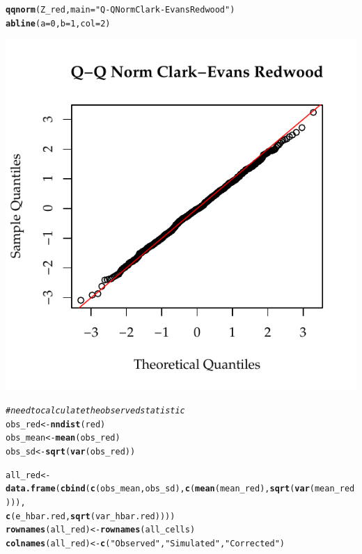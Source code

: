 \documentclass{article}\usepackage[]{graphicx}\usepackage[]{color}
\makeatletter
\def\maxwidth{ %
  \ifdim\Gin@nat@width>\linewidth
    \linewidth
  \else
    \Gin@nat@width
  \fi
}
\newcommand{\hlnum}[1]{\textcolor[rgb]{0.686,0.059,0.569}{#1}}%
\newcommand{\hlstr}[1]{\textcolor[rgb]{0.192,0.494,0.8}{#1}}%
\newcommand{\hlcom}[1]{\textcolor[rgb]{0.678,0.584,0.686}{\textit{#1}}}%
\newcommand{\hlstd}[1]{\textcolor[rgb]{0.345,0.345,0.345}{#1}}%
\newcommand{\hlkwb}[1]{\textcolor[rgb]{0.69,0.353,0.396}{#1}}%
\newcommand{\hlkwc}[1]{\textcolor[rgb]{0.333,0.667,0.333}{#1}}%
\newcommand{\hlkwd}[1]{\textcolor[rgb]{0.737,0.353,0.396}{\textbf{#1}}}%
\newenvironment{kframe}{%
 \def\at@end@of@kframe{}%
 \ifinner\ifhmode%
  \def\at@end@of@kframe{\end{minipage}}%
  \begin{minipage}{\columnwidth}%
 \fi\fi%
 \def\FrameCommand##1{\hskip\@totalleftmargin \hskip-\fboxsep
 \colorbox{shadecolor}{##1}\hskip-\fboxsep
     \hskip-\linewidth \hskip-\@totalleftmargin \hskip\columnwidth}%
 \MakeFramed {\advance\hsize-\width
   \@totalleftmargin\z@ \linewidth\hsize
   \@setminipage}}%
 {\par\unskip\endMakeFramed%
 \at@end@of@kframe}
\newenvironment{knitrout}{}{} %
\makeatother
\begin{document}
\begin{enumerate}
\begin{enumerate}
\begin{knitrout}
\begin{kframe}
\begin{alltt}
\hlkwd{qqnorm}\hlstd{(Z_red,} \hlkwc{main} \hlstd{=} \hlstr{"Q-Q Norm Clark-Evans Redwood"}\hlstd{)}
\hlkwd{abline}\hlstd{(}\hlkwc{a}\hlstd{=}\hlnum{0}\hlstd{,}\hlkwc{b}\hlstd{=}\hlnum{1}\hlstd{,}\hlkwc{col}\hlstd{=}\hlnum{2}\hlstd{)}
\end{alltt}
\end{kframe}

{\centering \includegraphics[width=\maxwidth]{figure/prob2g_redwood-1} 

}



\end{knitrout}

\begin{kframe}
\begin{alltt}
\hlcom{# need to calculate the observed statistic}
\hlstd{obs_red} \hlkwb{<-} \hlkwd{nndist}\hlstd{(red)}
\hlstd{obs_mean} \hlkwb{<-} \hlkwd{mean}\hlstd{(obs_red)}
\hlstd{obs_sd} \hlkwb{<-} \hlkwd{sqrt}\hlstd{(}\hlkwd{var}\hlstd{(obs_red))}

\hlstd{all_red} \hlkwb{<-} \hlkwd{data.frame}\hlstd{(}\hlkwd{cbind}\hlstd{(}\hlkwd{c}\hlstd{(obs_mean,obs_sd),}\hlkwd{c}\hlstd{(}\hlkwd{mean}\hlstd{(mean_red),} \hlkwd{sqrt}\hlstd{(}\hlkwd{var}\hlstd{(mean_red))),}
                              \hlkwd{c}\hlstd{(e_hbar.red,}\hlkwd{sqrt}\hlstd{(var_hbar.red))))}
\hlkwd{rownames}\hlstd{(all_red)} \hlkwb{<-} \hlkwd{rownames}\hlstd{(all_cells)}
\hlkwd{colnames}\hlstd{(all_red)} \hlkwb{<-} \hlkwd{c}\hlstd{(}\hlstr{"Observed"}\hlstd{,} \hlstr{"Simulated"}\hlstd{,} \hlstr{"Corrected"}\hlstd{)}


\end{alltt}
\end{kframe}
\end{enumerate}
\end{enumerate}
\end{document}
